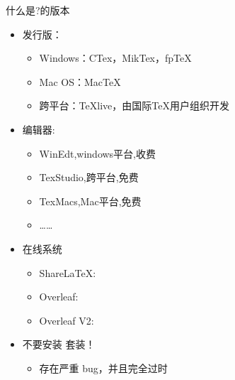 \documentclass[fontset = adobe, xcolor=svgnames, t, aspectratio=169]{ctexbeamer}
\begin{document}
\begin{frame}[t]{什么是\latex?}{\latex 的版本}
  \stretchon
  \begin{itemize}
  \item 发行版：
    \begin{itemize}    
    \item Windows：CTex，MikTex，fpTeX
    \item Mac OS：MacTeX        
    \item 跨平台：\alert{TeXlive}，由国际{\TeX}用户组织开发
    \end{itemize}
  \item 编辑器:
    \begin{itemize}
    \item WinEdt,windows平台,收费
    \item \alert{TexStudio},跨平台,免费
    \item TexMacs,Mac平台,免费
    \item \ldots\ldots
    \end{itemize}
  \item 在线系统
    \begin{itemize}
    \item
      {ShareLaTeX}: 
    \item
      {Overleaf}: 
    \item
      {Overleaf V2}: 
    \end{itemize}
  \item \alert{不要安装\CTeX{} 套装！} 
    \begin{itemize}
      \item \alert{存在严重 bug，并且完全过时}
    \end{itemize}
  \end{itemize}
  \stretchoff
\end{frame}
\end{document}
